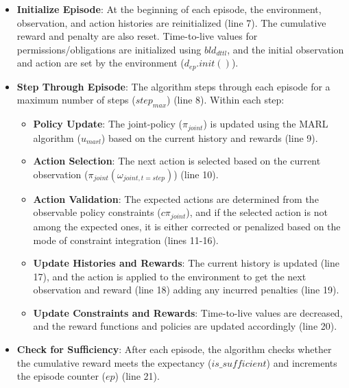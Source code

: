 \documentclass[runningheads]{llncs}
\theoremstyle{freethm}
\theoremstyle{proofoutline}
\begin{document}
\begin{itemize}
    \item \textbf{Initialize Episode}:
          At the beginning of each episode, the environment, observation, and action histories are reinitialized (line 7). The cumulative reward and penalty are also reset. Time-to-live values for permissions/obligations are initialized using $bld_{dttl}$, and the initial observation and action are set by the environment ($d_{ep}.init()$).

    \item \textbf{Step Through Episode}:
          The algorithm steps through each episode for a maximum number of steps ($step_{max}$) (line 8). Within each step:

          \begin{itemize}
              \item \textbf{Policy Update}:
                    The joint-policy ($\pi_{joint}$) is updated using the MARL algorithm ($u_{marl}$) based on the current history and rewards (line 9).

              \item \textbf{Action Selection}:
                    The next action is selected based on the current observation ($\pi_{joint}(\omega_{joint,t=step})$) (line 10).

              \item \textbf{Action Validation}:
                    The expected actions are determined from the observable policy constraints ($c\pi_{joint}$), and if the selected action is not among the expected ones, it is either corrected or penalized based on the mode of constraint integration (lines 11-16).

              \item \textbf{Update Histories and Rewards}:
                    The current history is updated (line 17), and the action is applied to the environment to get the next observation and reward (line 18) adding any incurred penalties (line 19).

              \item \textbf{Update Constraints and Rewards}:
                    Time-to-live values are decreased, and the reward functions and policies are updated accordingly (line 20).
          \end{itemize}

    \item \textbf{Check for Sufficiency}:
          After each episode, the algorithm checks whether the cumulative reward meets the expectancy ($is\_sufficient$) and increments the episode counter ($ep$) (line 21).
\end{itemize}
\end{document}
